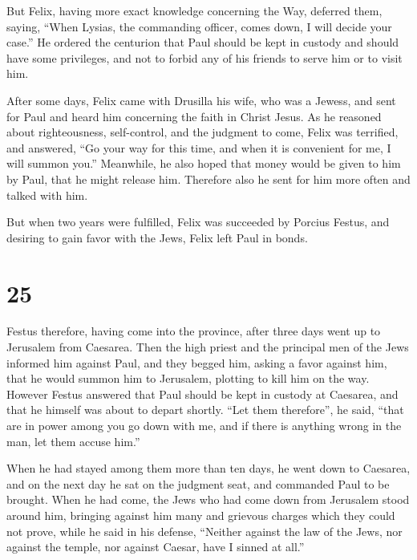  But Felix, having more exact knowledge concerning the Way,
deferred them, saying, ``When Lysias, the commanding officer, comes
down, I will decide your case.''  He ordered the centurion
that Paul should be kept in custody and should have some privileges, and
not to forbid any of his friends to serve him or to visit him.

 After some days, Felix came with Drusilla his wife, who
was a Jewess, and sent for Paul and heard him concerning the faith in
Christ Jesus.  As he reasoned about righteousness,
self-control, and the judgment to come, Felix was terrified, and
answered, ``Go your way for this time, and when it is convenient for me,
I will summon you.''  Meanwhile, he also hoped that money
would be given to him by Paul, that he might release him. Therefore also
he sent for him more often and talked with him.

 But when two years were fulfilled, Felix was succeeded by
Porcius Festus, and desiring to gain favor with the Jews, Felix left
Paul in bonds.

\hypertarget{section-24}{%
\section{25}\label{section-24}}

 Festus therefore, having come into the province, after
three days went up to Jerusalem from Caesarea.  Then the
high priest and the principal men of the Jews informed him against Paul,
and they begged him,  asking a favor against him, that he
would summon him to Jerusalem, plotting to kill him on the way.
 However Festus answered that Paul should be kept in custody
at Caesarea, and that he himself was about to depart shortly.
 ``Let them therefore'', he said, ``that are in power among
you go down with me, and if there is anything wrong in the man, let them
accuse him.''

 When he had stayed among them more than ten days, he went
down to Caesarea, and on the next day he sat on the judgment seat, and
commanded Paul to be brought.  When he had come, the Jews
who had come down from Jerusalem stood around him, bringing against him
many and grievous charges which they could not prove,  while
he said in his defense, ``Neither against the law of the Jews, nor
against the temple, nor against Caesar, have I sinned at all.''

